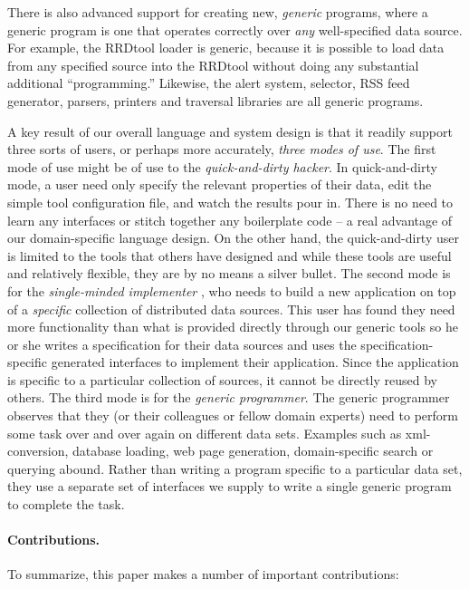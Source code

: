 There is also advanced support for creating new, {\em generic}
programs, where a generic program is one that operates correctly over
{\em any} well-specified data source.  For example, the RRDtool loader
is generic, because it is possible to load data from any specified
source into the RRDtool without doing any substantial additional
``programming.''  Likewise, the alert system, selector, RSS feed
generator, parsers, printers and traversal libraries are all generic
programs.

A key result of our overall language and system design is that it
readily support three sorts of users, or perhaps more accurately, {\em
three modes of use}.  The first mode of use might be of use to the
{\em quick-and-dirty hacker}.  In quick-and-dirty mode, a user need
only specify the relevant properties of their data, edit the simple
tool configuration file, and watch the results pour in.  There is no
need to learn any interfaces or stitch together any boilerplate code
-- a real advantage of our domain-specific language design.  On the
other hand, the quick-and-dirty user is limited to the tools that
others have designed and while these tools are useful and relatively
flexible, they are by no means a silver bullet.  The second mode is
for the {\em single-minded implementer }, who needs to build a new
application on top of a {\em specific} collection of distributed data
sources.  This user has found they need more functionality than what
is provided directly through our generic tools so he or she writes a
specification for their data sources and uses the
specification-specific generated interfaces to implement their
application.  Since the application is specific to a particular
collection of sources, it cannot be directly reused by others.  The
third mode is for the {\em generic programmer}.  The generic
programmer observes that they (or their colleagues or fellow domain
experts) need to perform some task over and over again on different
data sets.  Examples such as xml-conversion, database loading, web
page generation, domain-specific search or querying abound.  Rather
than writing a program specific to a particular data set, they use a
separate set of interfaces we supply to write a single generic program
to complete the task.

\paragraph*{Contributions.}  To summarize, this paper makes a number of 
important contributions:

